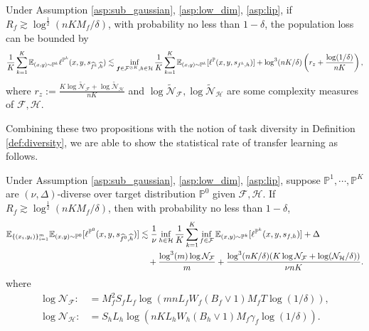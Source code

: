 \documentclass[11pt]{article}
\numberwithin{equation}{section}
\renewcommand{\P}{\mathbb{P}}
\begin{document}
\begin{prop}\label{prop:generalization_train_informal}
    Under Assumption \ref{asp:sub_gaussian}, \ref{asp:low_dim}, \ref{asp:lip}, if $R_f\gtrsim\log^{\frac{1}{2}}(nKM_f/\delta)$, with probability no less than $1-\delta$,
    the population loss can be bounded by
    \begin{equation}
        \frac{1}{K}\sum_{k=1}^K\E_{(x,y)\sim\P^k}\ell^{\P^k}(x,y,s_{\widehat{f}^k,\widehat{h}})\lesssim \inf_{\vf\in\mathcal{F}^{\otimes K},h\in\mathcal{H}}\frac{1}{K}\sum_{k=1}^K\E_{(x,y)\sim\P^k}[\ell^\P(x,y,s_{f^k,h})] + \log^3(nK/\delta)\left(r_z+\frac{\log(1/\delta)}{nK}\right),
    \end{equation}
    where $r_z:=\frac{K\log\widetilde{\mathcal{N}}_\mathcal{F}+\log\widetilde{\mathcal{N}}_\mathcal{H}}{nK}$ and $\log\widetilde{\mathcal{N}}_\mathcal{F},\log\widetilde{\mathcal{N}}_\mathcal{H}$ are some complexity measures of $\mathcal{F},\mathcal{H}$.
\end{prop}
Combining these two propositions with the notion of task diversity in Definition \ref{def:diversity}, we are able to show the statistical rate of transfer learning as follows.
\begin{thm}\label{thm:generalization_all_diversity_informal}
    Under Assumption \ref{asp:sub_gaussian}, \ref{asp:low_dim}, \ref{asp:lip}, suppose $\P^1,\cdots,\P^K$ are $(\nu,\Delta)$-diverse over target distribution $\P^0$ given $\mathcal{F},\mathcal{H}$.
    If $R_f\gtrsim\log^{\frac{1}{2}}(nKM_f/\delta)$,
    then with probability no less than $1-\delta$, 
    \begin{equation}
        \begin{aligned}
            \E_{\{(x_i,y_i)\}_{i=1}^m} \E_{(x,y)\sim\P^0} [\ell^{\P^0}(x,y,s_{\widehat{f}^{0},\widehat{h}})]
            &\lesssim \frac{1}{\nu}\inf_{h\in\mathcal{H}} \frac{1}{K}\sum_{k=1}^K \inf_{f\in\mathcal{F}}\E_{(x,y)\sim\P^k} [\ell^{\P^k} (x,y,s_{f,h})] + \Delta \\
            &\quad +\frac{\log^3(m)\log\mathcal{N}_\mathcal{F}}{m} + \frac{\log^3(nK/\delta)(K\log\mathcal{N}_\mathcal{F}+\log(\mathcal{N}_\mathcal{H}/\delta))}{\nu nK}.
        \end{aligned}
    \end{equation}
    where
    \begin{equation}\label{eq:def_complexity}
        \begin{aligned}
            \log\mathcal{N}_\mathcal{F}:&=M_f^2S_fL_f\log\left(mnL_fW_f(B_f\vee 1)M_fT\log(1/\delta)\right), \\
            \log\mathcal{N}_\mathcal{H}:&=S_hL_h\log\left(nKL_hW_h(B_h\vee 1)M_f\gamma_f\log(1/\delta)\right).
        \end{aligned}
    \end{equation}
\end{thm}
\end{document}
